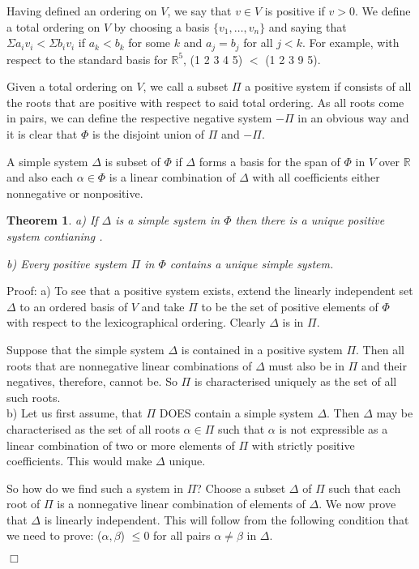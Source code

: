 \documentclass[12pt]{article}
\newtheorem{theorem}[definition]{Theorem}
\newenvironment{proof}{\normalsize {\sc Proof}:}{{\hfill $\Box$ \\}}
\begin{document}
\begin{enumeratation}
Having defined an ordering on $V$, we say that $v \in V$ is positive if $v > 0$. We define a total ordering on $V$ by choosing a basis $\{v_1, \dots, v_n\}$ and saying that $\Sigma a_i v_i < \Sigma b_i v_i$ if $a_k < b_k$ for some $k$ and $a_j = b_j$ for all $j < k$. For example, with respect to the standard basis for $\mathbb{R}^5$, (1 2 3 4 5) $<$ (1 2 3 9 5).

Given a total ordering on $V$, we call a subset $\Pi$ a positive system if consists of all the roots that are positive with respect to said total ordering. As all roots come in pairs, we can define the respective negative system $-\Pi$ in an obvious way and it is clear that $\Phi$ is the disjoint union of $\Pi$ and $-\Pi$.

A simple system $\Delta$ is subset of $\Phi$ if $\Delta$ forms a basis for the span of $\Phi$ in $V$ over $\mathbb{R}$ and also each $\alpha \in \Phi$ is a linear combination of $\Delta$ with all coefficients either nonnegative or nonpositive.

\begin{theorem}

a) If $\Delta$ is a simple system in $\Phi$ then there is a unique positive system contianing \Delta.

b) Every positive system $\Pi$ in $\Phi$ contains a unique simple system.
\end{theorem}

\begin{proof}
a) To see that a positive system exists, extend the linearly independent set $\Delta$ to an ordered basis of $V$ and take $\Pi$ to be the set of positive elements of $\Phi$ with respect to the lexicographical ordering. Clearly $\Delta$ is in $\Pi$.

Suppose that the simple system $\Delta$ is contained in a positive system $\Pi$. Then all roots that are nonnegative linear combinations of $\Delta$ must also be in $\Pi$ and their negatives, therefore, cannot be. So $\Pi$ is characterised uniquely as the set of all such roots.
\\

b) Let us first assume, that $\Pi$ DOES contain a simple system $\Delta$. Then $\Delta$ may be characterised as the set of all roots $\alpha \in \Pi$ such that $\alpha$ is not expressible as a linear combination of two or more elements of $\Pi$ with strictly positive coefficients. This would make $\Delta$ unique.

So how do we find such a system in $\Pi$? Choose a subset $\Delta$ of $\Pi$ such that each root of $\Pi$ is a nonnegative linear combination of elements of $\Delta$. We now prove that $\Delta$ is linearly independent. This will follow from the following condition that we need to prove: ($\alpha, \beta$) $\le 0$ for all pairs $\alpha \ne \beta$ in $\Delta$.


\end{proof}
\end{enumeratation}
\end{document}
